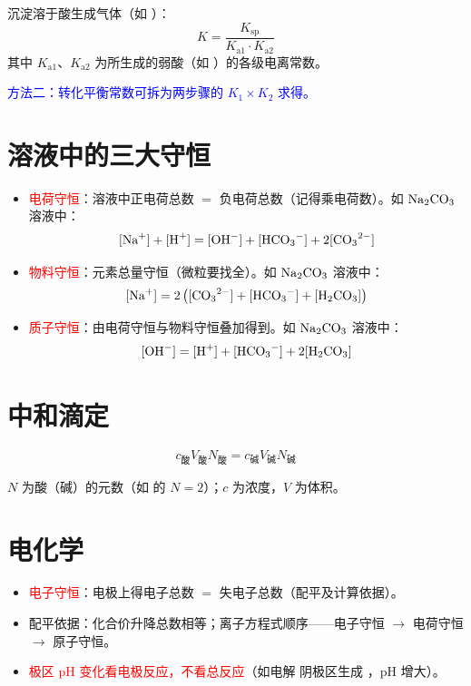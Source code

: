             沉淀溶于酸生成气体（如 ）：\[
                K = \frac{K_\text{sp}}{K_\text{a1} \cdot K_\text{a2}}
            \]
            其中 \(K_\text{a1}\)、\(K_\text{a2}\) 为所生成的弱酸（如 ）的各级电离常数。

            \textcolor{blue}{方法二：转化平衡常数可拆为两步骤的 \(K_1 \times K_2\) 求得。}

    \section{溶液中的三大守恒}\label{app:公式-守恒}

        \begin{itemize}
            \item \textcolor{red}{电荷守恒}：溶液中正电荷总数 \(=\) 负电荷总数（记得乘电荷数）。如 \(\cemh{Na2CO3}\) 溶液中：
            \[
                \cemh{[Na+]} + \cemh{[H+]} = \cemh{[OH^-]} + \cemh{[HCO3^-]} + 2\cemh{[CO3^{2-}]}
            \]
            \item \textcolor{red}{物料守恒}：元素总量守恒（微粒要找全）。如 \(\cemh{Na2CO3}\) 溶液中：
            \[
                \cemh{[Na+]} = 2\left(\cemh{[CO3^{2-}]} + \cemh{[HCO3^-]} + \cemh{[H2CO3]}\right)
            \]
            \item \textcolor{red}{质子守恒}：由电荷守恒与物料守恒叠加得到。如 \(\cemh{Na2CO3}\) 溶液中：
            \[
                \cemh{[OH^-]} = \cemh{[H+]} + \cemh{[HCO3^-]} + 2\cemh{[H2CO3]}
            \]
        \end{itemize}

    \section{中和滴定}\label{app:公式-滴定}

        \[
            c_\text{酸} V_\text{酸} N_\text{酸} = c_\text{碱} V_\text{碱} N_\text{碱}
        \]

        \(N\) 为酸（碱）的元数（如  的 \(N = 2\)）；\(c\) 为浓度，\(V\) 为体积。

    \section{电化学}\label{app:公式-电化学}

        \begin{itemize}
            \item \textcolor{red}{电子守恒}：电极上得电子总数 \(=\) 失电子总数（配平及计算依据）。
            \item 配平依据：化合价升降总数相等；离子方程式顺序——电子守恒 \(\to\) 电荷守恒 \(\to\) 原子守恒。
            \item \textcolor{red}{极区 pH 变化看电极反应，不看总反应}（如电解  阴极区生成 ，pH 增大）。
        \end{itemize}

